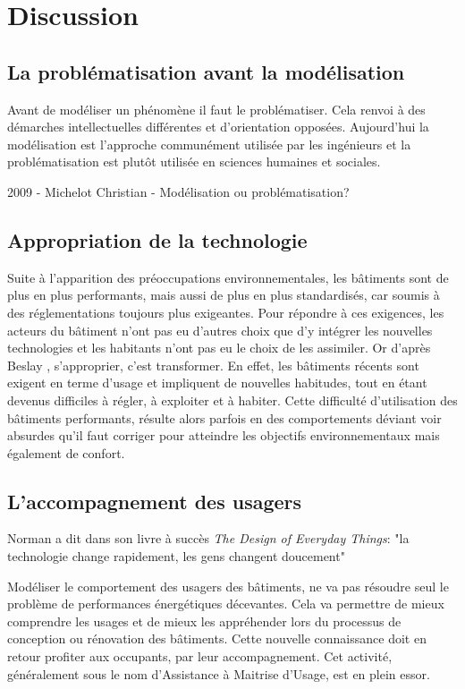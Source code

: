 \chapter{Discussion}

\section{La problématisation avant la modélisation}

Avant de modéliser un phénomène il faut le problématiser. Cela renvoi à des démarches intellectuelles différentes et d'orientation opposées. Aujourd'hui la modélisation est l'approche communément utilisée par les ingénieurs et la problématisation est plutôt utilisée en sciences humaines et sociales.

2009 - Michelot Christian - Modélisation ou problématisation?

\section{Appropriation de la technologie}

Suite à l'apparition des préoccupations environnementales, les bâtiments sont de plus en plus performants, mais aussi de plus en plus standardisés, car soumis à des réglementations toujours plus exigeantes. Pour répondre à ces exigences, les acteurs du bâtiment n'ont pas eu d'autres choix que d'y intégrer les nouvelles technologies et les habitants n'ont pas eu le choix de les assimiler. Or d'après Beslay \cite{Beslay-08}, s'approprier, c'est transformer. En effet, les bâtiments récents sont exigent en terme d'usage et impliquent de nouvelles habitudes, tout en étant devenus difficiles à régler, à exploiter et à habiter. Cette difficulté d'utilisation des bâtiments performants, résulte alors parfois en des comportements déviant voir absurdes qu'il faut corriger pour atteindre les objectifs environnementaux mais également de confort.

\section{L'accompagnement des usagers}

Norman \cite{Norman-88} a dit dans son livre à succès \textit{The Design of Everyday Things}: "la technologie change rapidement, les gens changent doucement"

Modéliser le comportement des usagers des bâtiments, ne va pas résoudre seul le problème de performances énergétiques décevantes. Cela va permettre de mieux comprendre les usages et de mieux les appréhender lors du processus de conception ou rénovation des bâtiments. Cette nouvelle connaissance doit en retour profiter aux occupants, par leur accompagnement. Cet activité, généralement sous le nom d'Assistance à Maitrise d'Usage, est en plein essor. 

